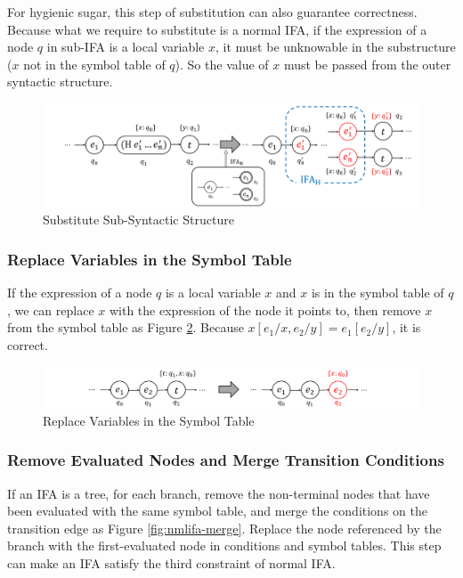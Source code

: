 For hygienic sugar, this step of substitution can also guarantee correctness. Because what we require to substitute is a normal IFA, if the expression of a node $q$ in sub-IFA is a local variable $x$, it must be unknowable in the substructure ($x$ not in the symbol table of $q$). So the value of $x$ must be passed from the outer syntactic structure.

\begin{figure}[t]
    \centering
    \includegraphics[scale=0.25]{images/nmlifa/nmlifa-subst.png}
    \caption{Substitute Sub-Syntactic Structure}
    \label{fig:nmlifa-subst}
\end{figure}

\subsubsection{Replace Variables in the Symbol Table}

If the expression of a node $q$ is a local variable $x$ and $x$ is in the symbol table of $q$, we can replace $x$ with the expression of the node it points to, then remove $x$ from the symbol table as Figure \ref{fig:nmlifa-replace}. Because $x[e_1/x, e_2/y]=e_1[e_2/y]$, it is correct.

\begin{figure}[t]
    \centering
    \includegraphics[scale=0.25]{images/nmlifa/nmlifa-replace.png}
    \caption{Replace Variables in the Symbol Table}
    \label{fig:nmlifa-replace}
\end{figure}

\subsubsection{Remove Evaluated Nodes and Merge Transition Conditions}

If an IFA is a tree, for each branch, remove the non-terminal nodes that have been evaluated with the same symbol table, and merge the conditions on the transition edge as Figure \ref{fig:nmlifa-merge}. Replace the node referenced by the branch with the first-evaluated node in conditions and symbol tables. This step can make an IFA satisfy the third constraint of normal IFA.


